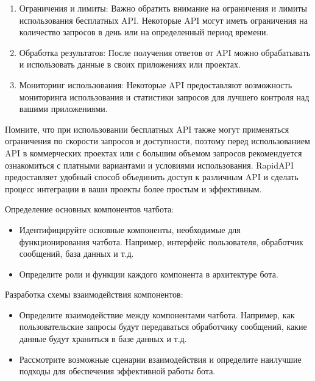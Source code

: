 \documentclass[letterpaper,10pt,russian]{sphinxmanual}
\begin{document}
\sphinxAtStartPar
{}
\begin{enumerate}
%
\setcounter{enumi}{5}
\item {} 
\sphinxAtStartPar
Ограничения и лимиты: Важно обратить внимание на ограничения и лимиты использования бесплатных API. Некоторые API могут иметь ограничения на количество запросов в день или на определенный период времени.

\item {} 
\sphinxAtStartPar
Обработка результатов: После получения ответов от API можно обрабатывать и использовать данные в своих приложениях или проектах.

\item {} 
\sphinxAtStartPar
Мониторинг использования: Некоторые API предоставляют возможность мониторинга использования и статистики запросов для лучшего контроля над вашими приложениями.

\end{enumerate}

\sphinxAtStartPar
Помните, что при использовании бесплатных API также могут применяться ограничения по скорости запросов и доступности, поэтому перед использованием API в коммерческих проектах или с большим объемом запросов рекомендуется ознакомиться с платными вариантами и условиями использования. RapidAPI предоставляет удобный способ объединить доступ к различным API и сделать процесс интеграции в ваши проекты более простым и эффективным.

 Определение основных компонентов чат\sphinxhyphen{}бота:
\begin{itemize}
\item {} 
\sphinxAtStartPar
Идентифицируйте основные компоненты, необходимые для функционирования чат\sphinxhyphen{}бота. Например, интерфейс пользователя, обработчик сообщений, база данных и т.д.

\item {} 
\sphinxAtStartPar
Определите роли и функции каждого компонента в архитектуре бота.

\end{itemize}

 Разработка схемы взаимодействия компонентов:
\begin{itemize}
\item {} 
\sphinxAtStartPar
Определите взаимодействие между компонентами чат\sphinxhyphen{}бота. Например, как пользовательские запросы будут передаваться обработчику сообщений, какие данные будут храниться в базе данных и т.д.

\item {} 
\sphinxAtStartPar
Рассмотрите возможные сценарии взаимодействия и определите наилучшие подходы для обеспечения эффективной работы бота.

\end{itemize}
\end{document}
